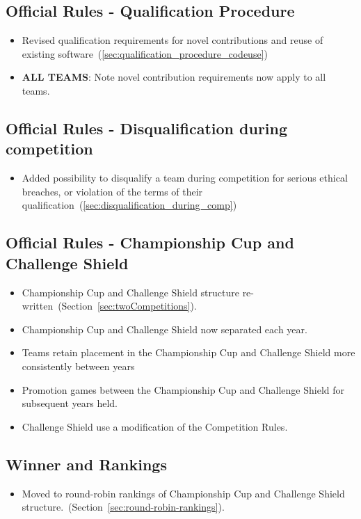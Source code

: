 \subsection*{Official Rules - Qualification Procedure}
\begin{itemize}
  \item Revised qualification requirements for novel contributions and reuse of existing software~(\cf \cref{sec:qualification_procedure_codeuse})
  \item \textbf{ALL TEAMS}: Note novel contribution requirements now apply to all teams.
\end{itemize}


\subsection*{Official Rules - Disqualification during competition}
\begin{itemize}
  \item Added possibility to disqualify a team during competition for serious ethical breaches, or violation of the terms of their qualification~(\cf \cref{sec:disqualification_during_comp})
\end{itemize}

\subsection*{Official Rules - Championship Cup and Challenge Shield}
\begin{itemize}
  \item Championship Cup and Challenge Shield structure re-written~(\cf Section~\ref{sec:twoCompetitions}).
  \item Championship Cup and Challenge Shield now separated each year.
  \item Teams retain placement in the Championship Cup and Challenge Shield more consistently between years
  \item Promotion games between the Championship Cup and Challenge Shield for subsequent years held.
  \item Challenge Shield use a modification of the Competition Rules.
\end{itemize}

\subsection*{Winner and Rankings}
\begin{itemize}
  \item Moved to round-robin rankings of Championship Cup and Challenge Shield structure.~(\cf Section~\ref{sec:round-robin-rankings}).
\end{itemize}

